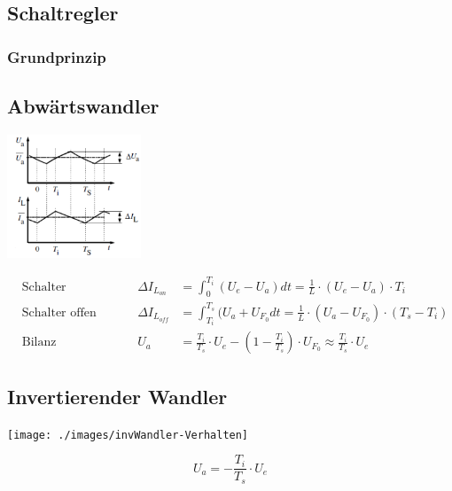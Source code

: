 \newpage


\subsection{Schaltregler}
	\subsubsection{Grundprinzip}
		



\subsection{Abwärtswandler}
	\begin{minipage}{6cm}
		\includegraphics[width=4cm]{./images/schaltregler/06_buck-Verhalten}
	\end{minipage}
	\begin{minipage}{12cm}
		\begin{align*}
			&\text{Schalter geschlossen} & \Delta I_{L_{on}} &= \int_{0}^{T_i} (U_e - U_a) dt = \frac{1}{L} \cdot (U_e - U_a) \cdot T_i \\
			&\text{Schalter offen} & \Delta I_{L_{off}} &= \int_{T_i}^{T_s}(U_a + U_{F_0} dt = \frac{1}{L} \cdot (U_a - U_{F_0}) \cdot (T_s - T_i) \\
			&\text{Bilanz} & U_a &= \frac{T_i}{T_s} \cdot U_e - \left(1-\frac{T_i}{T_s} \right) \cdot U_{F_0} \approx \frac{T_i}{T_s} \cdot U_e
		\end{align*}
	\end{minipage}
	
\subsection{Invertierender Wandler}
	\begin{minipage}{6cm}
		\texttt{[image: ./images/invWandler-Verhalten]}
	\end{minipage}
	\begin{minipage}{12cm}
		\[ U_a = -\frac{T_i}{T_s} \cdot U_e \]
	\end{minipage}

